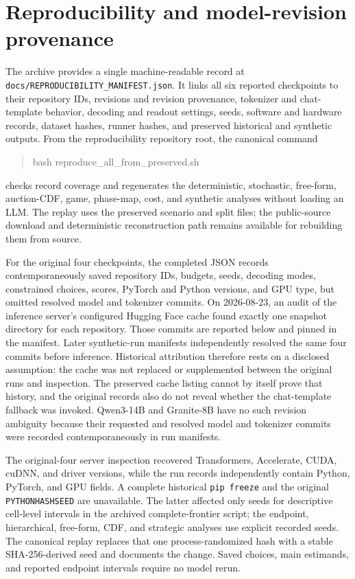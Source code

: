 \documentclass{article}
\begin{document}
\section{Reproducibility and model-revision provenance}
\label{app:reproducibility}

The archive provides a single machine-readable record at
\texttt{docs/REPRODUCIBILITY\_MANIFEST.json}. It links all six reported checkpoints to their repository IDs, revisions and revision provenance, tokenizer and chat-template behavior, decoding and readout settings, seeds, software and hardware records, dataset hashes, runner hashes, and preserved historical and synthetic outputs. From the reproducibility repository root, the canonical command
\begin{quote}\footnotesize\ttfamily
bash reproduce\_all\_from\_preserved.sh
\end{quote}
checks record coverage and regenerates the deterministic, stochastic, free-form, auction-CDF, game, phase-map, cost, and synthetic analyses without loading an LLM. The replay uses the preserved scenario and split files; the public-source download and deterministic reconstruction path remains available for rebuilding them from source.

For the original four checkpoints, the completed JSON records contemporaneously saved repository IDs, budgets, seeds, decoding modes, constrained choices, scores, PyTorch and Python versions, and GPU type, but omitted resolved model and tokenizer commits. On 2026-08-23, an audit of the inference server's configured Hugging Face cache found exactly one snapshot directory for each repository. Those commits are reported below and pinned in the manifest. Later synthetic-run manifests independently resolved the same four commits before inference. Historical attribution therefore rests on a disclosed assumption: the cache was not replaced or supplemented between the original runs and inspection. The preserved cache listing cannot by itself prove that history, and the original records also do not reveal whether the chat-template fallback was invoked. Qwen3-14B and Granite-8B have no such revision ambiguity because their requested and resolved model and tokenizer commits were recorded contemporaneously in run manifests.

The original-four server inspection recovered Transformers, Accelerate, CUDA, cuDNN, and driver versions, while the run records independently contain Python, PyTorch, and GPU fields. A complete historical \texttt{pip freeze} and the original \texttt{PYTHONHASHSEED} are unavailable. The latter affected only seeds for descriptive cell-level intervals in the archived complete-frontier script; the endpoint, hierarchical, free-form, CDF, and strategic analyses use explicit recorded seeds. The canonical replay replaces that one process-randomized hash with a stable SHA-256-derived seed and documents the change. Saved choices, main estimands, and reported endpoint intervals require no model rerun.
\end{document}
